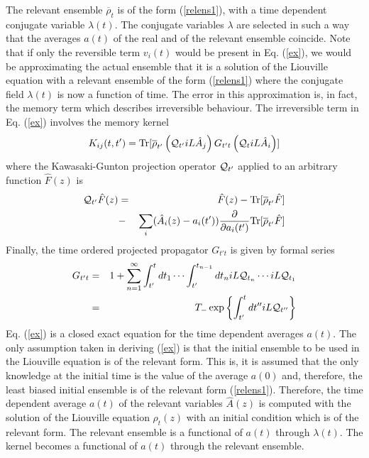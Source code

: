 \documentclass[a4paper,openright,12pt]{book}
\begin{document}
The  relevant
ensemble $\overline{\rho}_t$  is of  the form (\ref{relens1}),  with a
time   dependent  conjugate   variable  $\lambda(t)$.   The  conjugate
variables  $\lambda$ are  selected in  such  a way  that the  averages
$a(t)$ of the  real and of the relevant ensemble  coincide.  Note that
if   only  the   reversible  term   $v_i(t)$  would   be  present   in
Eq. (\ref{ex}), we would be  approximating the actual ensemble that it
is a  solution of the Liouville  equation with a relevant  ensemble of
the form (\ref{relens1}) where the conjugate field $\lambda(t)$ is now
a function of time.  The error  in this approximation is, in fact, the
memory term which describes  irreversible behaviour.  The irreversible
term in Eq. (\ref{ex}) involves the memory kernel
\begin{equation}
K_{ij}(t,t') =
{\rm Tr}[\overline{\rho}_{t'} 
\left({\cal Q}_{t'} iL\hat{A}_j\right) G_{t't}
\left({\cal Q}_{t } iL\hat{A}_i\right)]
\label{ker}
\end{equation}
where   the  Kawasaki-Gunton   projection  operator   ${\cal  Q}_{t'}$
\cite{Kawasaki1973a,  Grabert1982}  applied  to an  arbitrary  function
$\hat{F}(z)$ is
\begin{eqnarray}
{\cal Q}_{t'}\hat{F}(z)& = &\hat{F}(z)- {\rm Tr}[\overline{\rho}_{t'} \hat{F}]
\nonumber\\
&-&\sum_i(\hat{A}_i(z)-a_i(t'))\frac{\partial }{\partial a_i(t')}
{\rm Tr}[\overline{\rho}_{t'} \hat{F}]
\label{Q}
\end{eqnarray}
Finally, the time ordered projected propagator $G_{t't}$ is given by formal series
\begin{eqnarray}
G_{t't}&=&1
+\sum_{n=1}^\infty \int_{t'}^tdt_1\cdots\int_{t'}^{t_{n-1}}dt_n
 iL{\cal Q}_{t_n}\cdots  iL{\cal Q}_{t_1}
\nonumber\\
&=&T_-\exp\left\{\int_{t'}^t dt''  iL{\cal Q}_{t''}\right\}
\end{eqnarray}
Eq.   (\ref{ex}) is  a closed  exact equation  for the  time dependent
averages $a(t)$.  The only assumption  taken in deriving (\ref{ex}) is
that the initial  ensemble to be used in the  Liouville equation is of
the relevant form.  This is, it is assumed that  the only knowledge at
the initial  time is the value  of the average $a(0)$  and, therefore,
the  least   biased  initial   ensemble  is   of  the   relevant  form
(\ref{relens1}).  Therefore, the time  dependent average $a(t)$ of the
relevant variables $\hat{A}(z)$  is computed with the  solution of the
Liouville equation $\rho_t(z)$  with an initial condition  which is of
the relevant  form.  The relevant  ensemble is a functional  of $a(t)$
through  $\lambda(t)$.   The kernel  becomes  a  functional of  $a(t)$
through the relevant  ensemble.  
\end{document}
